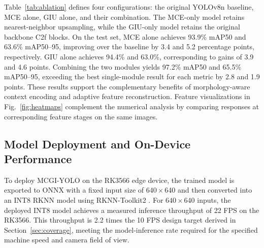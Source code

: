 \documentclass[journal]{IEEEtranTIE}
\newcommand{\model}{MCGI-YOLO\xspace}
\begin{document}
Table~\ref{tab:ablation} defines four configurations: the original YOLOv8n baseline, MCE alone, GIU alone, and their combination. The MCE-only model retains nearest-neighbor upsampling, while the GIU-only model retains the original backbone C2f blocks. On the test set, MCE alone achieves 93.9\% mAP50 and 63.6\% mAP50--95, improving over the baseline by 3.4 and 5.2 percentage points, respectively. GIU alone achieves 94.4\% and 63.0\%, corresponding to gains of 3.9 and 4.6 points. Combining the two modules yields 97.2\% mAP50 and 65.5\% mAP50--95, exceeding the best single-module result for each metric by 2.8 and 1.9 points. These results support the complementary benefits of morphology-aware context encoding and adaptive feature reconstruction. Feature visualizations in Fig.~\ref{fig:heatmaps} complement the numerical analysis by comparing responses at corresponding feature stages on the same images.



\subsection{Model Deployment and On-Device Performance}
\label{sec:deployment}
To deploy \model on the RK3566 edge device, the trained model is exported to ONNX with a fixed input size of $640\times$640 and then converted into an INT8 RKNN model using RKNN-Toolkit2 \cite{rockchiptoolkit2}. For $640\times$640 inputs, the deployed INT8 model achieves a measured inference throughput of 22 FPS on the RK3566. This throughput is 2.2 times the 10 FPS design target derived in Section~\ref{sec:coverage}, meeting the model-inference rate required for the specified machine speed and camera field of view.
\end{document}
